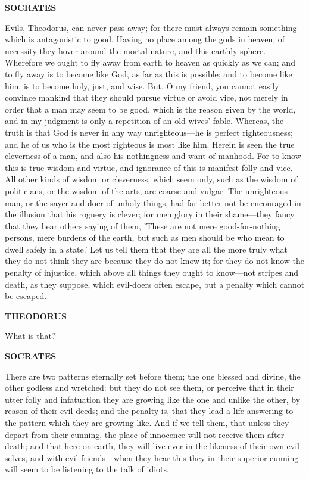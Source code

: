 \documentclass[11pt,letter]{article}
\begin{document}
\par \textbf{SOCRATES}
\par   Evils, Theodorus, can never pass away; for there must always remain something which is antagonistic to good. Having no place among the gods in heaven, of necessity they hover around the mortal nature, and this earthly sphere. Wherefore we ought to fly away from earth to heaven as quickly as we can; and to fly away is to become like God, as far as this is possible; and to become like him, is to become holy, just, and wise. But, O my friend, you cannot easily convince mankind that they should pursue virtue or avoid vice, not merely in order that a man may seem to be good, which is the reason given by the world, and in my judgment is only a repetition of an old wives' fable. Whereas, the truth is that God is never in any way unrighteous—he is perfect righteousness; and he of us who is the most righteous is most like him. Herein is seen the true cleverness of a man, and also his nothingness and want of manhood. For to know this is true wisdom and virtue, and ignorance of this is manifest folly and vice. All other kinds of wisdom or cleverness, which seem only, such as the wisdom of politicians, or the wisdom of the arts, are coarse and vulgar. The unrighteous man, or the sayer and doer of unholy things, had far better not be encouraged in the illusion that his roguery is clever; for men glory in their shame—they fancy that they hear others saying of them, 'These are not mere good-for-nothing persons, mere burdens of the earth, but such as men should be who mean to dwell safely in a state.' Let us tell them that they are all the more truly what they do not think they are because they do not know it; for they do not know the penalty of injustice, which above all things they ought to know—not stripes and death, as they suppose, which evil-doers often escape, but a penalty which cannot be escaped.

\par \textbf{THEODORUS}
\par   What is that?

\par \textbf{SOCRATES}
\par   There are two patterns eternally set before them; the one blessed and divine, the other godless and wretched:  but they do not see them, or perceive that in their utter folly and infatuation they are growing like the one and unlike the other, by reason of their evil deeds; and the penalty is, that they lead a life answering to the pattern which they are growing like. And if we tell them, that unless they depart from their cunning, the place of innocence will not receive them after death; and that here on earth, they will live ever in the likeness of their own evil selves, and with evil friends—when they hear this they in their superior cunning will seem to be listening to the talk of idiots.
\end{document}
